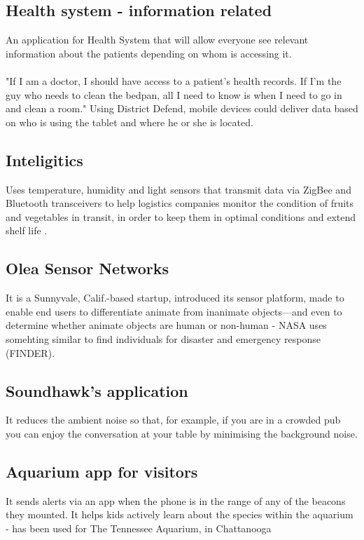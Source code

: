 \documentclass[12pt]{article}
\begin{document}
\subsection{Health system - information related} An application for Health System that will allow everyone see relevant information about the patients depending on whom is accessing it.
\paragraph {} "If I am a doctor, I should have access to a patient's health records. If I'm the guy who needs to clean the bedpan, all I need to know is when I need to go in and clean a room." Using District Defend, mobile devices could deliver data based on who is using the tablet and where he or she is located.

 \subsection{Inteligitics} Uses temperature, humidity and light sensors that transmit data via ZigBee and Bluetooth transceivers to help logistics companies monitor the condition of fruits and vegetables in transit, in order to keep them in optimal conditions and extend shelf life \cite{notes}.

  \subsection {Olea Sensor Networks} It is a Sunnyvale, Calif.-based startup, introduced its sensor platform, made to enable end users to differentiate animate from inanimate objects—and even to determine whether animate objects are human or non-human -  NASA uses somehting similar to find individuals for disaster and emergency response (FINDER)\cite{olea}.

\subsection {Soundhawk's application} It reduces the ambient noise so that, for example, if you are in a crowded pub you can enjoy the conversation at your table by minimising the background noise.

 \subsection {Aquarium app for visitors} It sends alerts via an app when the phone is in the range of any of the beacons they mounted. It helps kids actively learn about the species within the aquarium -  has been used for The Tennessee Aquarium, in Chattanooga \cite{norman}
\end{document}
